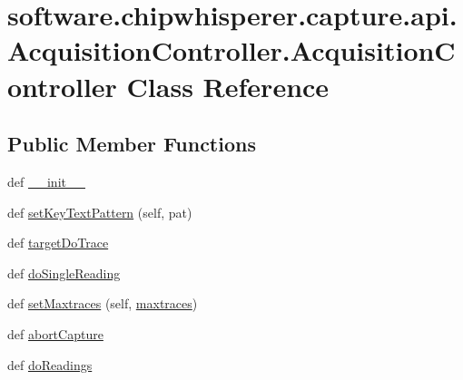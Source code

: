 \hypertarget{classsoftware_1_1chipwhisperer_1_1capture_1_1api_1_1AcquisitionController_1_1AcquisitionController}{}\section{software.\+chipwhisperer.\+capture.\+api.\+Acquisition\+Controller.\+Acquisition\+Controller Class Reference}
\label{classsoftware_1_1chipwhisperer_1_1capture_1_1api_1_1AcquisitionController_1_1AcquisitionController}
\subsection*{Public Member Functions}
\begin{DoxyCompactItemize}
\item 
def \hyperlink{classsoftware_1_1chipwhisperer_1_1capture_1_1api_1_1AcquisitionController_1_1AcquisitionController_a6901c12ab8a3c59e004668eba09b6db7}{\+\_\+\+\_\+init\+\_\+\+\_\+}
\item 
def \hyperlink{classsoftware_1_1chipwhisperer_1_1capture_1_1api_1_1AcquisitionController_1_1AcquisitionController_a75e804746a29b132341ee088900621b4}{set\+Key\+Text\+Pattern} (self, pat)
\item 
def \hyperlink{classsoftware_1_1chipwhisperer_1_1capture_1_1api_1_1AcquisitionController_1_1AcquisitionController_adfa14d6ff03b3aab422e40a0fb25650c}{target\+Do\+Trace}
\item 
def \hyperlink{classsoftware_1_1chipwhisperer_1_1capture_1_1api_1_1AcquisitionController_1_1AcquisitionController_a5de004d99d7b610a1af90e460d1ca149}{do\+Single\+Reading}
\item 
def \hyperlink{classsoftware_1_1chipwhisperer_1_1capture_1_1api_1_1AcquisitionController_1_1AcquisitionController_ac678c7f5f8f39727edfeba7853348185}{set\+Maxtraces} (self, \hyperlink{classsoftware_1_1chipwhisperer_1_1capture_1_1api_1_1AcquisitionController_1_1AcquisitionController_a1ccca7f63c75e7691751ada44d8b54ee}{maxtraces})
\item 
def \hyperlink{classsoftware_1_1chipwhisperer_1_1capture_1_1api_1_1AcquisitionController_1_1AcquisitionController_a9375308b94f0b7b2b86faad611b44d70}{abort\+Capture}
\item 
def \hyperlink{classsoftware_1_1chipwhisperer_1_1capture_1_1api_1_1AcquisitionController_1_1AcquisitionController_adddcd342983d3fc7e5a82c2bfa055aba}{do\+Readings}
\end{DoxyCompactItemize}
